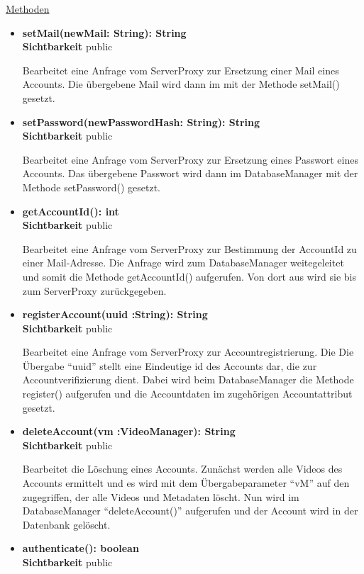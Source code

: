 \underline{Methoden}
\begin{itemize}
\itemsep0pt
\item \textbf{setMail(newMail: String): String}\hfill\\
\textbf{Sichtbarkeit} public

Bearbeitet eine Anfrage vom ServerProxy zur Ersetzung einer Mail eines Accounts. Die übergebene Mail wird dann im  mit der Methode setMail() gesetzt.

\item \textbf{setPassword(newPasswordHash: String): String}\hfill\\
\textbf{Sichtbarkeit} public

Bearbeitet eine Anfrage vom ServerProxy zur Ersetzung eines Passwort eines Accounts. Das übergebene Passwort wird dann im DatabaseManager mit der Methode setPassword() gesetzt.

\item \textbf{getAccountId(): int}\hfill\\
\textbf{Sichtbarkeit} public

Bearbeitet eine Anfrage vom ServerProxy zur Bestimmung der AccountId zu einer Mail-Adresse. Die Anfrage wird zum DatabaseManager weitegeleitet und somit die Methode getAccountId() aufgerufen. Von dort aus wird sie bis zum ServerProxy zurückgegeben.  

\item \textbf{registerAccount(uuid :String): String}\hfill\\
\textbf{Sichtbarkeit} public

Bearbeitet eine Anfrage vom ServerProxy zur Accountregistrierung. Die Die Übergabe ``uuid'' stellt eine Eindeutige id des Accounts dar, die zur Accountverifizierung dient. Dabei wird beim DatabaseManager die Methode register() aufgerufen und die Accountdaten im zugehörigen Accountattribut gesetzt. 

\item \textbf{deleteAccount(vm :VideoManager): String}\hfill\\
\textbf{Sichtbarkeit} public

Bearbeitet die Löschung eines Accounts. Zunächst werden alle Videos des Accounts ermittelt und es wird mit dem Übergabeparameter ``vM'' auf den  zugegriffen, der alle Videos und Metadaten löscht. Nun wird im DatabaseManager ``deleteAccount()'' aufgerufen und der Account wird in der Datenbank gelöscht.

\item \textbf{authenticate(): boolean}\hfill\\
\textbf{Sichtbarkeit} public


\end{itemize}
